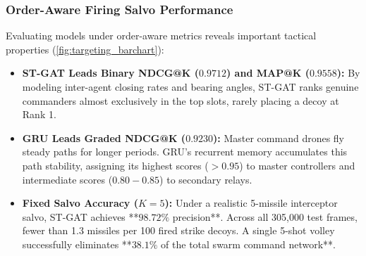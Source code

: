 \documentclass[9pt]{ieeeconf}
\begin{document}
\subsubsection{Order-Aware Firing Salvo Performance}
Evaluating models under order-aware metrics reveals important tactical properties (\cref{fig:targeting_barchart}):
\begin{itemize}
    \item \textbf{ST-GAT Leads Binary NDCG@K ($0.9712$) and MAP@K ($0.9558$):} By modeling inter-agent closing rates and bearing angles, ST-GAT ranks genuine commanders almost exclusively in the top slots, rarely placing a decoy at Rank 1.
    \item \textbf{GRU Leads Graded NDCG@K ($0.9230$):} Master command drones fly steady paths for longer periods. GRU's recurrent memory accumulates this path stability, assigning its highest scores ($>0.95$) to master controllers and intermediate scores ($0.80 - 0.85$) to secondary relays.
    \item \textbf{Fixed Salvo Accuracy ($K=5$):} Under a realistic 5-missile interceptor salvo, ST-GAT achieves **$98.72\%$ precision**. Across all 305,000 test frames, fewer than 1.3 missiles per 100 fired strike decoys. A single 5-shot volley successfully eliminates **$38.1\%$ of the total swarm command network**.
\end{itemize}
\end{document}
